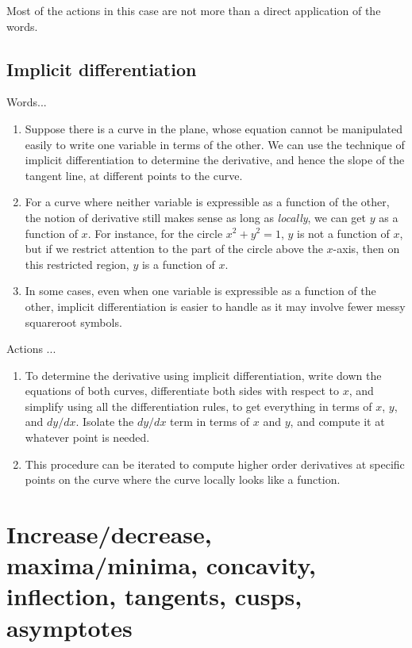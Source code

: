 \documentclass[10pt]{amsart}
\begin{document}
Most of the actions in this case are not more than a direct
application of the words.

\subsection{Implicit differentiation}

Words...

\begin{enumerate}
\item Suppose there is a curve in the plane, whose equation cannot be
  manipulated easily to write one variable in terms of the other. We
  can use the technique of implicit differentiation to determine the
  derivative, and hence the slope of the tangent line, at different
  points to the curve.
\item For a curve where neither variable is expressible as a function
  of the other, the notion of derivative still makes sense as long as
  {\em locally}, we can get $y$ as a function of $x$. For instance,
  for the circle $x^2 + y^2 = 1$, $y$ is not a function of $x$, but if
  we restrict attention to the part of the circle above the $x$-axis,
  then on this restricted region, $y$ is a function of $x$.
\item In some cases, even when one variable is expressible as a
  function of the other, implicit differentiation is easier to handle
  as it may involve fewer messy squareroot symbols.
\end{enumerate}

Actions ...

\begin{enumerate}
\item To determine the derivative using implicit differentiation,
  write down the equations of both curves, differentiate both sides
  with respect to $x$, and simplify using all the differentiation
  rules, to get everything in terms of $x$, $y$, and $dy/dx$. Isolate
  the $dy/dx$ term in terms of $x$ and $y$, and compute it at whatever
  point is needed.
\item This procedure can be iterated to compute higher order
  derivatives at specific points on the curve where the curve locally
  looks like a function.
\end{enumerate}

\section{Increase/decrease, maxima/minima, concavity, inflection, tangents, cusps, asymptotes}
\end{document}
